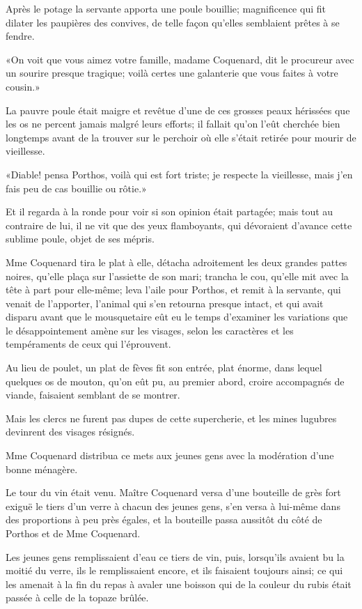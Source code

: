 Après le potage la servante apporta une poule bouillie; magnificence qui fit dilater les paupières des convives, de telle façon qu'elles semblaient prêtes à se fendre. 

«On voit que vous aimez votre famille, madame Coquenard, dit le procureur avec un sourire presque tragique; voilà certes une galanterie que vous faites à votre cousin.» 

La pauvre poule était maigre et revêtue d'une de ces grosses peaux hérissées que les os ne percent jamais malgré leurs efforts; il fallait qu'on l'eût cherchée bien longtemps avant de la trouver sur le perchoir où elle s'était retirée pour mourir de vieillesse. 

«Diable! pensa Porthos, voilà qui est fort triste; je respecte la vieillesse, mais j'en fais peu de cas bouillie ou rôtie.» 

Et il regarda à la ronde pour voir si son opinion était partagée; mais tout au contraire de lui, il ne vit que des yeux flamboyants, qui dévoraient d'avance cette sublime poule, objet de ses mépris. 

Mme Coquenard tira le plat à elle, détacha adroitement les deux grandes pattes noires, qu'elle plaça sur l'assiette de son mari; trancha le cou, qu'elle mit avec la tête à part pour elle-même; leva l'aile pour Porthos, et remit à la servante, qui venait de l'apporter, l'animal qui s'en retourna presque intact, et qui avait disparu avant que le mousquetaire eût eu le temps d'examiner les variations que le désappointement amène sur les visages, selon les caractères et les tempéraments de ceux qui l'éprouvent. 

Au lieu de poulet, un plat de fèves fit son entrée, plat énorme, dans lequel quelques os de mouton, qu'on eût pu, au premier abord, croire accompagnés de viande, faisaient semblant de se montrer. 

Mais les clercs ne furent pas dupes de cette supercherie, et les mines lugubres devinrent des visages résignés. 

Mme Coquenard distribua ce mets aux jeunes gens avec la modération d'une bonne ménagère. 

Le tour du vin était venu. Maître Coquenard versa d'une bouteille de grès fort exiguë le tiers d'un verre à chacun des jeunes gens, s'en versa à lui-même dans des proportions à peu près égales, et la bouteille passa aussitôt du côté de Porthos et de Mme Coquenard. 

Les jeunes gens remplissaient d'eau ce tiers de vin, puis, lorsqu'ils avaient bu la moitié du verre, ils le remplissaient encore, et ils faisaient toujours ainsi; ce qui les amenait à la fin du repas à avaler une boisson qui de la couleur du rubis était passée à celle de la topaze brûlée. 

